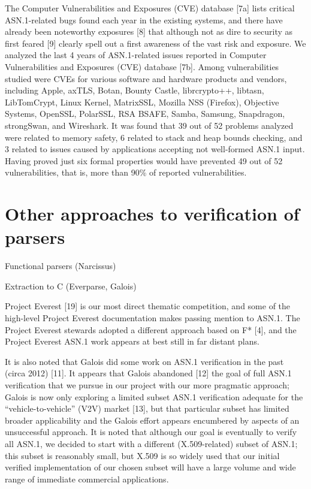 \documentclass{article}
\begin{document}
 The Computer Vulnerabilities and Exposures (CVE) database [7a] lists critical ASN.1-related bugs found each year in the existing systems, and there have already been noteworthy exposures [8] that although not as dire to security as first feared [9] clearly spell out a first awareness of the vast risk and exposure. We analyzed the last 4 years of ASN.1-related issues reported in Computer Vulnerabilities and Exposures (CVE) database [7b]. Among vulnerabilities studied were CVEs for various software and hardware products and vendors, including Apple, axTLS, Botan, Bounty Castle, librcrypto++, libtasn, LibTomCrypt, Linux Kernel, MatrixSSL, Mozilla NSS (Firefox), Objective Systems, OpenSSL, PolarSSL, RSA BSAFE, Samba, Samsung, Snapdragon, strongSwan, and Wireshark. It was found that 39 out of 52 problems analyzed were related to memory safety, 6 related to stack and heap bounds checking, and 3 related to issues caused by applications accepting not well-formed ASN.1 input. Having proved just six formal properties would have prevented 49 out of 52 vulnerabilities, that is, more than 90\% of reported vulnerabilities.

 \section{Other approaches to verification of parsers}

  Functional parsers (Narcissus)

  Extraction to C (Everparse, Galois)

  Project Everest [19] is our most direct thematic competition, and some of the high-level Project Everest documentation makes passing mention to ASN.1. The Project Everest stewards adopted a different approach based on F* [4], and the Project Everest ASN.1 work  appears at best still in far distant plans.

It is also noted that Galois did some work on ASN.1 verification in the past (circa 2012) [11]. It appears that Galois abandoned [12] the goal of full ASN.1 verification that we pursue in our project with our more pragmatic approach; Galois is now only exploring a limited subset ASN.1 verification adequate for the “vehicle-to-vehicle” (V2V) market [13], but that particular subset has limited broader applicability and the Galois effort appears encumbered by aspects of an unsuccessful  approach. It is noted that although our goal is eventually to verify all ASN.1, we decided to start with a different (X.509-related) subset of ASN.1; this subset is reasonably small, but X.509 is so widely used that our initial verified implementation of our chosen subset will have a large volume and wide range of immediate commercial applications.
\end{document}
